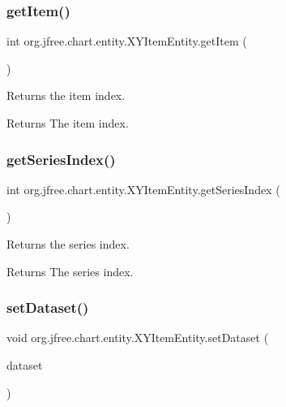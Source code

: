 \subsubsection{\texorpdfstring{get\+Item()}{getItem()}}
{\footnotesize\ttfamily int org.\+jfree.\+chart.\+entity.\+X\+Y\+Item\+Entity.\+get\+Item (\begin{DoxyParamCaption}{ }\end{DoxyParamCaption})}

Returns the item index.

\begin{DoxyReturn}{Returns}
The item index. 
\end{DoxyReturn}
\mbox{\label{classorg_1_1jfree_1_1chart_1_1entity_1_1_x_y_item_entity_abe78c2f104387a3b64a42799638e1e54}} 
\subsubsection{\texorpdfstring{get\+Series\+Index()}{getSeriesIndex()}}
{\footnotesize\ttfamily int org.\+jfree.\+chart.\+entity.\+X\+Y\+Item\+Entity.\+get\+Series\+Index (\begin{DoxyParamCaption}{ }\end{DoxyParamCaption})}

Returns the series index.

\begin{DoxyReturn}{Returns}
The series index. 
\end{DoxyReturn}
\mbox{\label{classorg_1_1jfree_1_1chart_1_1entity_1_1_x_y_item_entity_a7abc7c46eb0a3b0aff9a119c06be45b0}} 
\subsubsection{\texorpdfstring{set\+Dataset()}{setDataset()}}
{\footnotesize\ttfamily void org.\+jfree.\+chart.\+entity.\+X\+Y\+Item\+Entity.\+set\+Dataset (\begin{DoxyParamCaption}\item[{\mbox{\hyperlink{interfaceorg_1_1jfree_1_1data_1_1xy_1_1_x_y_dataset}{X\+Y\+Dataset}}}]{dataset }\end{DoxyParamCaption})}

